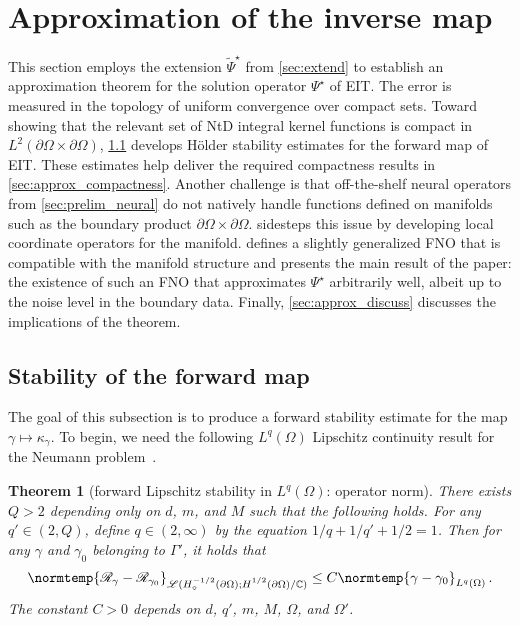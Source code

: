 \documentclass[pdflatex,sn-mathphys-num]{sn-jnl-preprint}
\newcommand{\C}{\mathbb{C}}
\newcommand{\sL}{\mathscr{L}}
\newcommand{\pOmega}{{\partial\Omega}}
\newcommand{\ntd}{\mathscr{R}_{\gamma}}
\newcommand{\ntdz}{\mathscr{R}_{\gamma_0}}
\newcommand{\norm}{\normtemp}
\theoremstyle{thmstyleone}%
\newtheorem{theorem}{Theorem}[section]%
\theoremstyle{thmstyletwo}%
\theoremstyle{thmstylethree}%
\numberwithin{equation}{section}
\numberwithin{theorem}{section}
\begin{document}
\section{Approximation of the inverse map}\label{sec:approx}
This section employs the extension $\widetilde{\Psi}^\star$ from \cref{sec:extend} to establish an approximation theorem for the solution operator $\Psi^\star$ of EIT. The error is measured in the topology of uniform convergence over compact sets. Toward showing that the relevant set of NtD integral kernel functions is compact in $L^2(\pOmega\times\pOmega)$, \cref{sec:approx_stability} develops H\"older stability estimates for the forward map of EIT. These estimates help deliver the required compactness results in \cref{sec:approx_compactness}.
Another challenge is that off-the-shelf neural operators from \cref{sec:prelim_neural} do not natively handle functions defined on manifolds such as the boundary product $\pOmega\times\pOmega$.  sidesteps this issue by developing local coordinate operators for the manifold.  defines a slightly generalized FNO that is compatible with the manifold structure and presents the main result of the paper: the existence of such an FNO that approximates $\Psi^\star$ arbitrarily well, albeit up to the noise level in the boundary data. Finally, \cref{sec:approx_discuss} discusses the implications of the theorem.

\subsection{Stability of the forward map}\label{sec:approx_stability}
The goal of this subsection is to produce a forward stability estimate for the map $\gamma\mapsto \kappa_\gamma$.
To begin, we need the following $L^q(\Omega)$ Lipschitz continuity result for the Neumann problem~\cite[Thm.~4.2 and Remark~4.5, p.~406]{rondi2008regularization}.
\begin{theorem}[forward Lipschitz stability in $L^q(\Omega)$: operator norm]\label{thm:forward_map_lip}
    There exists $Q>2$ depending only on $d$, $m$, and $M$ such that the following holds. For any $q'\in (2,Q)$, define $q\in(2,\infty)$ by the equation $1/q +1/q' +1/2=1$. Then for any $\gamma$ and $\gamma_0$ belonging to $\Gamma'$, it holds that
    \begin{align}
        \norm{\ntd-\ntdz}_{\sL(H_\diamond^{-1/2}(\pOmega);H_{\phantom{\diamond}}^{1/2}(\pOmega)/\C)}\leq C\norm{\gamma-\gamma_0}_{L^q(\Omega)}\,.
    \end{align}
    The constant $C>0$ depends on $d$, $q'$, $m$, $M$, $\Omega$, and $\Omega'$.
\end{theorem}
\end{document}
